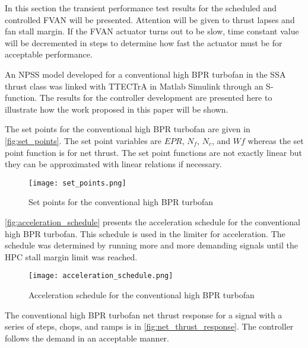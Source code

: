 
In this section the transient performance test results for the scheduled and controlled FVAN will be presented. Attention will be given to thrust lapses and fan stall margin. If the FVAN actuator turns out to be slow, time constant value will be decremented in steps to determine how fast the actuator must be for acceptable performance.

An NPSS model developed for a conventional high BPR turbofan in the SSA thrust class was linked with TTECTrA in Matlab Simulink through an S-function. The results for the controller development are presented here to illustrate how the work proposed in this paper will be shown.

The set points for the conventional high BPR turbofan are given in \autoref{fig:set_points}. The set point variables are $EPR$, $N_f$, $N_c$, and $Wf$ whereas the set point function is for net thrust. The set point functions are not exactly linear but they can be approximated with linear relations if necessary.  

\begin{figure}[!htb]
    \begin{center}
    \texttt{[image: set\_points.png]}
    \caption{Set points for the conventional high BPR turbofan}
    \label{fig:set_points}
    \end{center}
\end{figure}

\autoref{fig:acceleration_schedule} presents the acceleration schedule for the conventional high BPR turbofan. This schedule is used in the limiter for acceleration. The schedule was determined by running more and more demanding signals until the HPC stall margin limit was reached. 

\begin{figure}[!htb]
    \begin{center}
    \texttt{[image: acceleration\_schedule.png]}
    \caption{Acceleration schedule for the conventional high BPR turbofan}
    \label{fig:acceleration_schedule}
    \end{center}
\end{figure}

The conventional high BPR turbofan net thrust response for a signal with a series of steps, chops, and ramps is in \autoref{fig:net_thrust_response}. The controller follows the demand in an acceptable manner.

